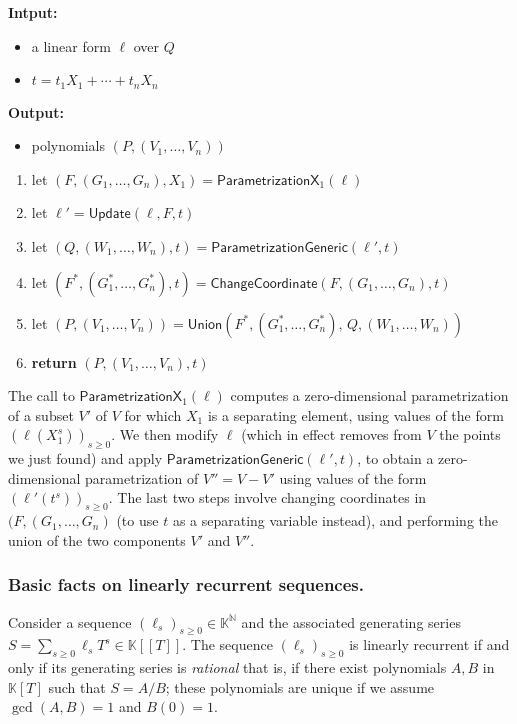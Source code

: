 \documentclass[12pt]{article}
\def\N {\ensuremath{\mathbb{N}}}
\def\K {\ensuremath{\mathbb{K}}}
\begin{document}
\begin{algorithm}[H]
 \caption{$\mathsf{Parametrization}(\ell,t)$} {\bf
   Intput:} \vspace{-0.5em}
 \begin{itemize}\setlength\itemsep{0em}
 \item a linear form $\ell$ over $Q$
 \item $t=t_1 X_1 + \cdots + t_n X_n$
 \end{itemize}
 {\bf Output:} \vspace{-0.5em}
 \begin{itemize}\setlength\itemsep{0em}
 \item polynomials $(P,(V_1,\dots,V_n))$
 \end{itemize}
 \begin{enumerate}
 \item let $(F,(G_1,\dots,G_n),X_1)=\mathsf{ParametrizationX}_1(\ell)$
 \item let $\ell'=\mathsf{Update}(\ell,F,t)$
 \item let $(Q,(W_1,\dots,W_n),t)=\mathsf{ParametrizationGeneric}(\ell',t)$
 \item let $(F^*,(G^*_1,\dots,G^*_n),t)=\mathsf{ChangeCoordinate}(F,(G_1,\dots,G_n),t)$
 \item let  $(P,(V_1,\dots,V_n))=\mathsf{Union}(F^*,(G^*_1,\dots,G^*_n),\, Q,(W_1,\dots,W_n))$
 \item \textbf{return} $(P,(V_1,\dots,V_n),t)$
 \end{enumerate}
\end{algorithm}

The call to $\mathsf{ParametrizationX}_1(\ell)$ computes a
zero-dimensional parametrization of a subset $V'$ of $V$ for which
$X_1$ is a separating element, using values of the form
$(\ell(X_1^s))_{s \ge 0}$. We then modify $\ell$ (which in effect
removes from $V$ the points we just found) and apply
$\mathsf{ParametrizationGeneric}(\ell',t)$, to obtain a
zero-dimensional parametrization of $V''=V-V'$ using values of the form
$(\ell'(t^s))_{s \ge 0}$. The last two steps involve changing
coordinates in $(F,(G_1,\dots,G_n)$ (to use $t$ as a separating
variable instead), and performing the union of the two components $V'$
and $V''$.

\subsubsection{Basic facts on linearly recurrent sequences.} Consider a sequence $(\ell_s)_{s \ge 0} \in \K^\N$
and the associated generating series $S=\sum_{s \ge 0} \ell_s T^s \in
\K[[T]]$. The sequence $(\ell_s)_{s \ge 0}$ is {\rm linearly recurrent} if and
only if its generating series is {\em rational} that is, if there
exist polynomials $A,B$ in $\K[T]$ such that $S=A/B$; these
polynomials are unique if we assume $\gcd(A,B)=1$ and $B(0)=1$. 
\end{document}

